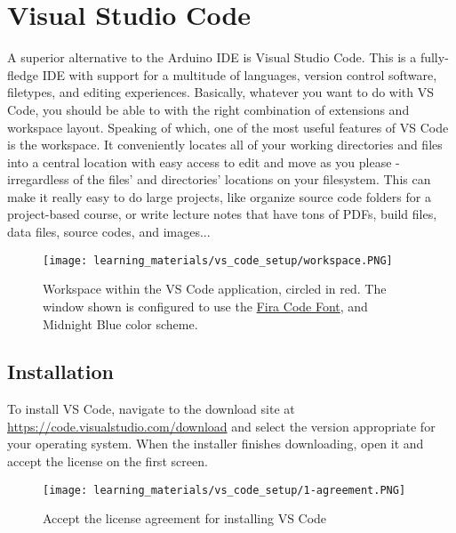 \section{Visual Studio Code}
A superior alternative to the Arduino IDE is Visual Studio Code.
This is a fully-fledge IDE with support for a multitude of languages, version control software, filetypes, and editing experiences.
Basically, whatever you want to do with VS Code, you should be able to with the right combination of extensions and workspace layout.
Speaking of which, one of the most useful features of VS Code is the workspace.
It conveniently locates all of your working directories and files into a central location with easy access to edit and move as you please - irregardless of the files' and directories' locations on your filesystem.
This can make it really easy to do large projects, like organize source code folders for a project-based course, or write lecture notes that have tons of PDFs, build files, data files, source codes, and images...

\begin{figure}[h!]
    \texttt{[image: learning\_materials/vs\_code\_setup/workspace.PNG]}
    \caption[VS Code workspace]{Workspace within the VS Code application, circled in red.
    The window shown is configured to use the \href{https://fonts.google.com/specimen/Fira+Code}{Fira Code Font}, and Midnight Blue color scheme.}
\end{figure}
    
    \subsection*{Installation}
    To install VS Code, navigate to the download site at \url{https://code.visualstudio.com/download} and select the version appropriate for your operating system.
    When the installer finishes downloading, open it and accept the license on the first screen.

    \begin{figure}[h!]
        \texttt{[image: learning\_materials/vs\_code\_setup/1-agreement.PNG]}
        \caption[VS Code License]{Accept the license agreement for installing VS Code}
    \end{figure}


